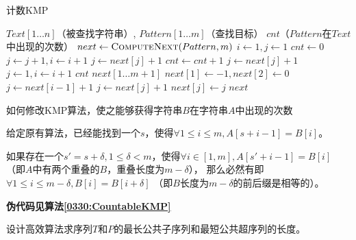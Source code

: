 \begin{questions}
    \begin{algorithm}[!ht]
        \caption{计数KMP}\label{0330:CountableKMP}
        \begin{algorithmic}[1]
            \Require $Text[1 \dots n]$（被查找字符串）, $Pattern[1 \dots m]$（查找目标）
            \Ensure $cnt$（$Pattern$在$Text$中出现的次数）
            \State $next \gets \Call{ComputeNext}{Pattern, m}$
            \State $i \gets 1, j \gets 1$
            \State $ cnt \gets 0$
            \State $j \gets j+1,i \gets i+1$
            \State $j \gets next[j] + 1$
            \State $cnt \gets cnt + 1$
            \EndIf
            \Else
            \State $j \gets next[j]+1$
            \State $j \gets 1, i \gets i+1$
            \EndIf
            \EndIf
            \EndWhile
            \State \Return $cnt$
            \EndProcedure
            \Statex
            \State $next[1 \dots m+1]$
            \State $next[1] \gets -1, next[2] \gets 0$
            \State $j \gets next[i-1] + 1$
            \State $j \gets next[j] + 1$
            \EndWhile
            \State $next[j] \gets j$
            \EndFor
            \State \Return $next$
            \EndProcedure
        \end{algorithmic}
    \end{algorithm}

    \question 如何修改KMP算法，使之能够获得字符串$B$在字符串$A$中出现的次数

    \begin{solution}
        给定原有算法，已经能找到一个$s$，使得$\forall 1 \leq i \leq m, A[s+i-1] = B[i]$。

        如果存在一个$s' = s + \delta, 1 \leq \delta < m$，使得$\forall i \in [1,m], A[s'+i-1] = B[i]$
        （即$A$中有两个重叠的$B$，重叠长度为$m - \delta$），
        那么必然有即$\forall 1 \leq i \leq m-\delta, B[i] = B[i+\delta]$
        （即$B$长度为$m-\delta$的前后缀是相等的）。

        \textbf{伪代码见算法\ref{0330:CountableKMP}}
    \end{solution}

    \question 设计高效算法求序列$T$和$P$的最长公共子序列和最短公共超序列的长度。
    \begin{parts}

\end{parts}
\end{questions}
